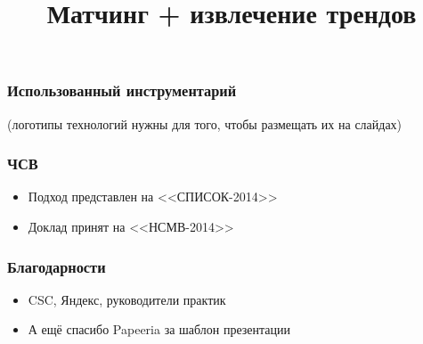 \documentclass{beamer}
\begin{document}
\begin{frame}\frametitle{Использованный инструментарий}

(логотипы технологий нужны для того, чтобы размещать их на слайдах)
\end{frame}


\begin{frame}\frametitle{ЧСВ}
\begin{itemize}
    \item Подход представлен на <<СПИСОК-2014>>
    \item Доклад принят на <<НСМВ-2014>>
\end{itemize}
\end{frame}

\begin{frame}\frametitle{Благодарности}
	\begin{itemize}
		\item CSC, Яндекс, руководители практик
		\item<2> А ещё спасибо Papeeria за шаблон презентации
	\end{itemize}
\end{frame}


{
\title{Матчинг + извлечение трендов}
\frame{\titlepage\label{lastframe}}
}

\end{document}
